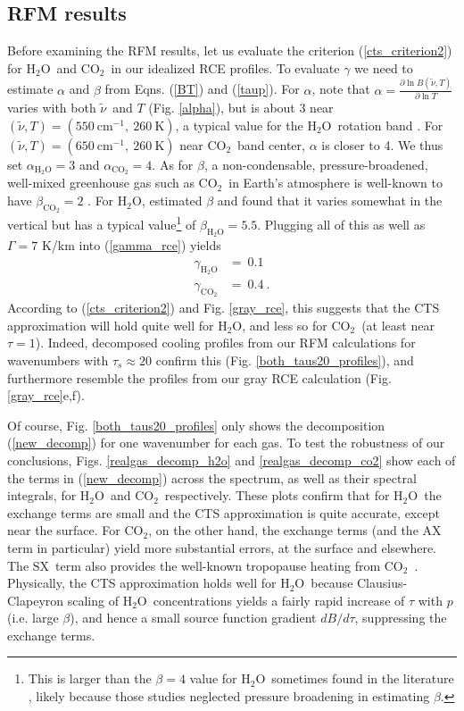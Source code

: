 \documentclass{ametsoc}
\newcommand{\beqn}{\begin{equation}}
\newcommand{\eeqn}{\end{equation}}
\newcommand{\eqnref}[1]{(\ref{#1})}
\newcommand{\Kelvin}{\ensuremath{\mathrm{K}}}
\newcommand{\cminverse}{\ensuremath{\mathrm{cm^{-1}}}}
\newcommand{\partialder}[2]{\ensuremath{\frac{\partial #1}{\partial #2}}}
\newcommand{\cotwo}{\ensuremath{\mathrm{CO_2}}}
\newcommand{\htwo}{\ensuremath{\mathrm{H_2O}}}
\newcommand{\wv}{\ensuremath{\widetilde{\nu}}}
\newcommand{\taus}{\ensuremath{\tau_s}}
\newcommand{\SX}{\ensuremath{\mathrm{SX}}}
\begin{document}
\subsection{RFM results} \label{sec_real_rce}
Before examining the RFM results, let us evaluate the criterion \eqnref{cts_criterion2} for \htwo\ and \cotwo\ in our idealized RCE profiles. To evaluate $\gamma$ we need to estimate $\alpha$ and $\beta$ from Eqns. \eqnref{BT} and \eqnref{taup}. For $\alpha$, note that $\alpha = \partialder{ \ln B(\wv,T)}{\ln T}$ varies with both \wv\ and $T$ (Fig. \ref{alpha}), but is about 3 near $(\wv,T)=(550\  \cminverse,\ 260\ \Kelvin)$, a typical value for the \htwo\ rotation band \citep[][]{jeevanjee2019a}. For $(\wv,T)=(650\  \cminverse,\ 260\  \Kelvin)$ near \cotwo\ band center, $\alpha$ is closer to 4.   We thus set $\alpha_{\htwo}=3 $ and $\alpha_{\cotwo}=4$.  As for $\beta$, a non-condensable, pressure-broadened, well-mixed greenhouse gas such as \cotwo\ in Earth's atmosphere is well-known to have $\beta_{\cotwo} = 2$ \citep{pierrehumbert2010}. For \htwo, \cite{jeevanjee2019a} estimated $\beta$ and found that it varies somewhat in the vertical but has a typical value\footnote{This is larger than the $\beta=4$ value for \htwo\ sometimes found in the literature \citep[e.g.][]{frierson2006}, likely because those studies neglected pressure broadening in estimating $\beta$.} of $\beta_{\htwo} = 5.5$. Plugging all of this as well as $\Gamma=7$ K/km into \eqnref{gamma_rce} yields
	\beqn
		\begin{split}
			\gamma_{\htwo}     & =  \  0.1        \\
			\gamma_{\cotwo}   & =  \ 0.4  \ .   		
		\end{split}
	\label{gamma_vals}
	\eeqn
According to \eqnref{cts_criterion2} and Fig. \ref{gray_rce}, this suggests that the CTS approximation will hold quite well for \htwo, and less so for \cotwo\ (at least near $\tau=1$). Indeed,  decomposed cooling profiles from our RFM calculations for wavenumbers with $\taus\approx20$  confirm this (Fig. \ref{both_taus20_profiles}), and furthermore resemble the profiles from our gray RCE calculation (Fig. \ref{gray_rce}e,f).

Of course, Fig. \ref{both_taus20_profiles} only shows the decomposition \eqnref{new_decomp} for one wavenumber for each gas. To test the robustness of our conclusions, Figs. \ref{realgas_decomp_h2o} and \ref{realgas_decomp_co2} show each of the terms in \eqnref{new_decomp} across the spectrum, as well as their spectral integrals, for \htwo\ and \cotwo\ respectively. These plots confirm that for \htwo\ the exchange terms are small and the CTS approximation is quite accurate, except near the surface. For \cotwo, on the other hand, the exchange terms (and the AX term in particular) yield more substantial errors, at the surface and elsewhere. The \SX\ term also provides the well-known tropopause heating from \cotwo\ \citep[e.g.][]{thuburn2002,zhu1992}. Physically, the CTS approximation holds well for \htwo\ because Clausius-Clapeyron scaling of \htwo\ concentrations yields a fairly rapid increase of $\tau$ with $p$ (i.e. large $\beta$), and hence a small source function gradient $dB/d\tau$, suppressing the exchange terms. 
\end{document}
